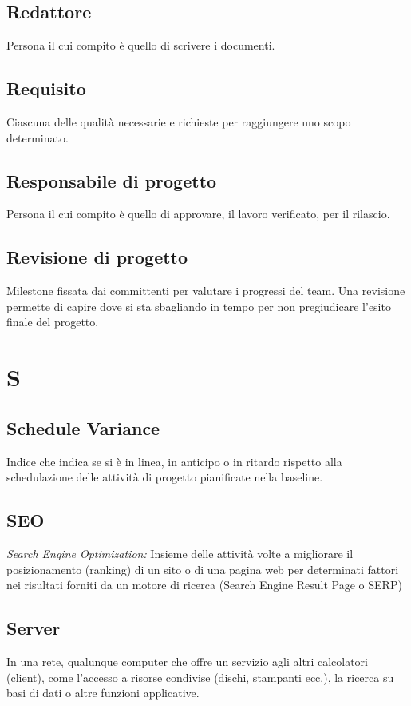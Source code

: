 \subsection*{Redattore}
Persona il cui compito è quello di scrivere i documenti.

\subsection*{Requisito}
Ciascuna delle qualità necessarie e richieste per raggiungere uno scopo determinato.

\subsection*{Responsabile di progetto}
Persona il cui compito è quello di approvare, il lavoro verificato, per il rilascio.

\subsection*{Revisione di progetto}
Milestone fissata dai committenti per valutare i progressi del team. Una revisione permette di capire dove si sta sbagliando in tempo per non pregiudicare l'esito finale del progetto.

\section*{S}
\subsection*{Schedule Variance}
Indice che indica se si è in linea, in anticipo o in ritardo rispetto alla schedulazione delle attività di progetto pianificate nella baseline.

\subsection*{SEO}
\textit{Search Engine Optimization:} Insieme delle attività volte a migliorare il posizionamento (ranking) di un sito o di una pagina web per determinati fattori nei risultati forniti
da un motore di ricerca (Search Engine Result Page o SERP)

\subsection*{Server}
In una rete, qualunque computer che offre un servizio agli altri calcolatori (client), come l'accesso a risorse condivise (dischi, stampanti ecc.), la ricerca su basi di dati o altre funzioni applicative.

